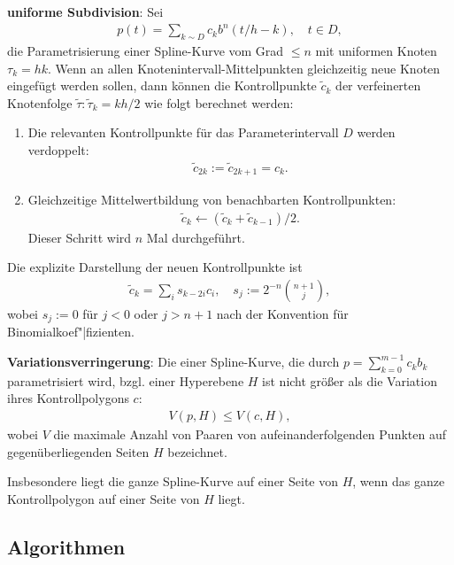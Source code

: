 \linie

\textbf{uniforme Subdivision}:
Sei
\begin{align*}
    p(t) = \sum_{k \sim D} c_k b^n(t/h - k),\quad t \in D,
\end{align*}
die Parametrisierung einer Spline-Kurve vom Grad $\le n$ mit uniformen Knoten $\tau_k = hk$.
Wenn an allen Knotenintervall-Mittelpunkten gleichzeitig neue Knoten eingefügt werden sollen,
dann können die Kontrollpunkte $\widetilde{c}_k$ der verfeinerten Knotenfolge
$\widetilde{\tau}\colon \widetilde{\tau}_k = kh/2$ wie folgt berechnet werden:
\begin{enumerate}
    \item
    Die relevanten Kontrollpunkte für das Parameterintervall $D$ werden verdoppelt:
    \begin{align*}
        \widetilde{c}_{2k} := \widetilde{c}_{2k+1} = c_k.
    \end{align*}

    \item
    Gleichzeitige Mittelwertbildung von benachbarten Kontrollpunkten:
    \begin{align*}
        \widetilde{c}_k \leftarrow (\widetilde{c}_k + \widetilde{c}_{k-1})/2.
    \end{align*}
    Dieser Schritt wird $n$ Mal durchgeführt.
\end{enumerate}
Die explizite Darstellung der neuen Kontrollpunkte ist
\begin{align*}
    \widetilde{c}_k = \sum_i s_{k-2i} c_i,\quad
    s_j := 2^{-n} \binom{n + 1}{j},
\end{align*}
wobei $s_j := 0$ für $j < 0$ oder $j > n + 1$ nach der Konvention für Binomialkoef"|fizienten.

\linie
\pagebreak

\textbf{Variationsverringerung}:
Die  einer Spline-Kurve, die durch $p = \sum_{k=0}^{m-1} c_k b_k$
parametrisiert wird, bzgl. einer Hyperebene $H$ ist nicht größer als die Variation
ihres Kontrollpolygons $c$:
\begin{align*}
    V(p, H) \le V(c, H),
\end{align*}
wobei $V$ die maximale Anzahl von Paaren von aufeinanderfolgenden Punkten auf gegenüberliegenden
Seiten $H$ bezeichnet.

Insbesondere liegt die ganze Spline-Kurve auf einer Seite von $H$, wenn das
ganze Kontrollpolygon auf einer Seite von $H$ liegt.

\subsection{%
    Algorithmen%
}

